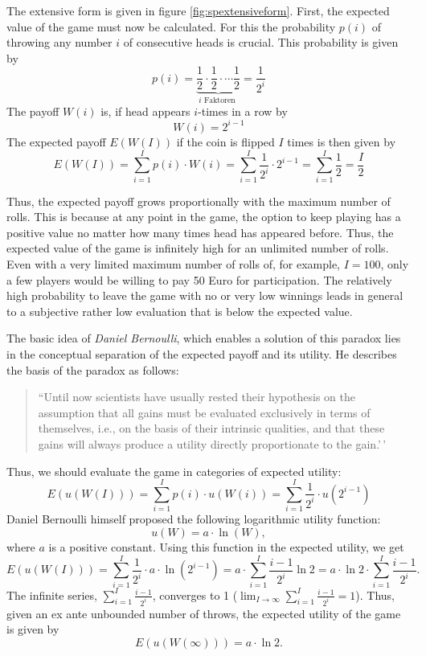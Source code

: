 \documentclass[
  12pt,
  oneside]{book}
\theoremstyle{definition}
\theoremstyle{definition}
\theoremstyle{definition}
\theoremstyle{definition}
\theoremstyle{remark}
\begin{document}
The extensive form is given in figure \ref{fig:spextensiveform}.
First, the expected value of the game must now be calculated. For this the probability \(p(i)\) of throwing any number \(i\) of consecutive heads is crucial. This probability is given by
\[
p(i)=\underbrace{\frac{1}{2} \cdot \frac{1}{2} \cdot \cdots \frac{1}{2}}_{i \text { Faktoren }}=\frac{1}{2^{i}}
\]
The payoff \(W(i)\) is, if head appears \(i\)-times in a row by
\[
W(i)=2^{i-1}
\]
The expected payoff \(E(W(I))\) if the coin is flipped \(I\) times is then given by
\[
E(W(I))=\sum_{i=1}^{I} p(i) \cdot W(i)=\sum_{i=1}^{I} \frac{1}{2^{i}} \cdot 2^{i-1}=\sum_{i=1}^{I} \frac{1}{2}=\frac{I}{2}
\]

Thus, the expected payoff grows proportionally with the maximum number of rolls. This is because at any point in the game, the option to keep playing has a positive value no matter how many times head has appeared before.
Thus, the expected value of the game is infinitely high for an unlimited number of rolls. Even with a very limited maximum number of rolls of, for example, \(I = 100\), only a few players would be willing to pay
50 Euro for participation. The relatively high probability to leave the game with no or very low winnings leads in general to a subjective rather low evaluation that is below the expected value.

The basic idea of \emph{Daniel Bernoulli}, which enables a solution of this paradox lies in the conceptual separation of the expected payoff and its utility. He describes the basis of the paradox as follows:

\begin{quote}
``Until now scientists have usually rested their hypothesis on the assumption that all gains must be evaluated exclusively in terms of themselves, i.e., on the basis of their intrinsic qualities, and that these gains will always produce a utility directly proportionate to the gain.'\,' \citep[p.~27]{Bernoulli1954Exposition}
\end{quote}

Thus, we should evaluate the game in categories of expected utility:
\[
E(u(W(I)))=\sum_{i=1}^{I} p(i) \cdot u(W(i))=\sum_{i=1}^{I} \frac{1}{2^{i}} \cdot u\left(2^{i-1}\right)
\]
Daniel Bernoulli himself proposed the following logarithmic utility function:
\[
u(W)=a \cdot \ln (W),
\]
where \(a\) is a positive constant. Using this function in the expected utility, we get
\[
E(u(W(I)))=\sum_{i=1}^{I} \frac{1}{2^{i}} \cdot a \cdot \ln \left(2^{i-1}\right)=a \cdot \sum_{i=1}^{I} \frac{i-1}{2^{i}} \ln 2=a \cdot \ln 2 \cdot \sum_{i=1}^{I} \frac{i-1}{2^{i}}.
\]
The infinite series, \(\sum_{i=1}^{I} \frac{i-1}{2^{i}}\), converges to 1 (\(\lim _{I \rightarrow \infty} \sum_{i=1}^{I} \frac{i-1}{2^{i}}=1\)). Thus, given an ex ante unbounded number of throws, the expected utility of the game is given by
\[
E(u(W(\infty)))=a \cdot \ln 2 .
\]
\end{document}
